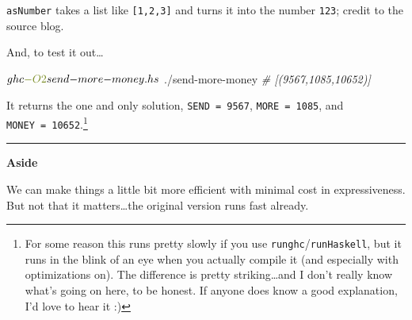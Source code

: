 \documentclass[]{article}
\newenvironment{Shaded}{}{}
\newcommand{\AttributeTok}[1]{\textcolor[rgb]{0.49,0.56,0.16}{#1}}
\newcommand{\CommentTok}[1]{\textcolor[rgb]{0.38,0.63,0.69}{\textit{#1}}}
\newcommand{\ExtensionTok}[1]{#1}
\newcommand{\NormalTok}[1]{#1}
\begin{document}
\texttt{asNumber} takes a list like \texttt{{[}1,2,3{]}} and turns it into the
number \texttt{123}; credit to the source blog.

And, to test it out\ldots{}

\begin{Shaded}
\begin{Highlighting}[]
\ExtensionTok{$}\NormalTok{ ghc }\AttributeTok{{-}O2}\NormalTok{ send{-}more{-}money.hs}
\ExtensionTok{$}\NormalTok{ ./send{-}more{-}money}
\CommentTok{\# [(9567,1085,10652)]}
\end{Highlighting}
\end{Shaded}

It returns the one and only solution, \texttt{SEND\ =\ 9567},
\texttt{MORE\ =\ 1085}, and \texttt{MONEY\ =\ 10652}.\footnote{For some reason
  this runs pretty slowly if you use \texttt{runghc}/\texttt{runHaskell}, but it
  runs in the blink of an eye when you actually compile it (and especially with
  optimizations on). The difference is pretty striking\ldots and I don't really
  know what's going on here, to be honest. If anyone does know a good
  explanation, I'd love to hear it :)}

\begin{center}\rule{0.5\linewidth}{0.5pt}\end{center}

\textbf{Aside}

We can make things a little bit more efficient with minimal cost in
expressiveness. But not that it matters\ldots the original version runs fast
already.
\end{document}
